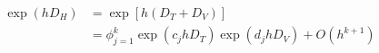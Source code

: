\documentclass[preview]{standalone}
\begin{document}
\begin{align*}
\begin{align}
                \exp(hD_H)&=\exp[h(D_T+D_V)]\\
                    &=\phi_{j=1}^k\exp(c_j hD_T)\exp(d_j hD_V)+O(h^{k+1})
            \end{align}
\end{align*}
\end{document}
